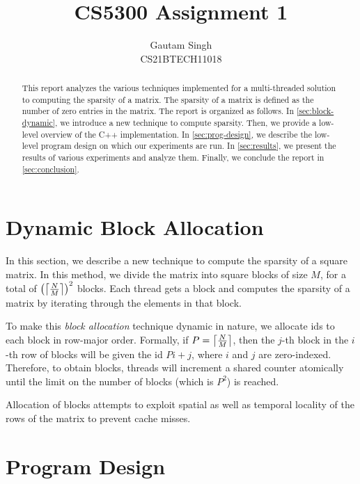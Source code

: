 \documentclass[conference,compsoc]{IEEEtran}
\begin{document}
\vspace{3cm}
\title{CS5300 Assignment 1}
\author{Gautam Singh\\CS21BTECH11018}
\maketitle
\tableofcontents

\bigskip

\begin{abstract}
    This report analyzes the various techniques implemented for a multi-threaded
    solution to computing the sparsity of a matrix. The sparsity of a matrix is
    defined as the number of zero entries in the matrix. The report is organized
    as follows. In \autoref{sec:block-dynamic}, we introduce a new technique to
    compute sparsity. Then, we provide a low-level overview of the C++
    implementation. In \autoref{sec:prog-design}, we describe the low-level
    program design on which our experiments are run. In \autoref{sec:results},
    we present the results of various experiments and analyze them. Finally, we
    conclude the report in \autoref{sec:conclusion}.  
\end{abstract}

\section{Dynamic Block Allocation}
\label{sec:block-dynamic}

In this section, we describe a new technique to compute the sparsity of a square
matrix. In this method, we divide the matrix into square blocks of size \(M\),
for a total of \(\left(\left\lceil\frac{N}{M}\right\rceil\right)^2\) blocks. Each thread gets a block
and computes the sparsity of a matrix by iterating through the elements in that
block.

To make this \emph{block allocation} technique dynamic in nature, we allocate
ids to each block in row-major order. Formally, if \(P = \left\lceil\frac{N}{M}\right\rceil\),
then the \(j\)-th block in the \(i\)-th row of blocks will be given the id \(Pi
+ j\), where \(i\) and \(j\) are zero-indexed. Therefore, to obtain blocks,
threads will increment a shared counter atomically until the limit on the number
of blocks (which is \(P^2\)) is reached.

Allocation of blocks attempts to exploit spatial as well as temporal locality of
the rows of the matrix to prevent cache misses.

\section{Program Design}
\label{sec:prog-design}
\end{document}
